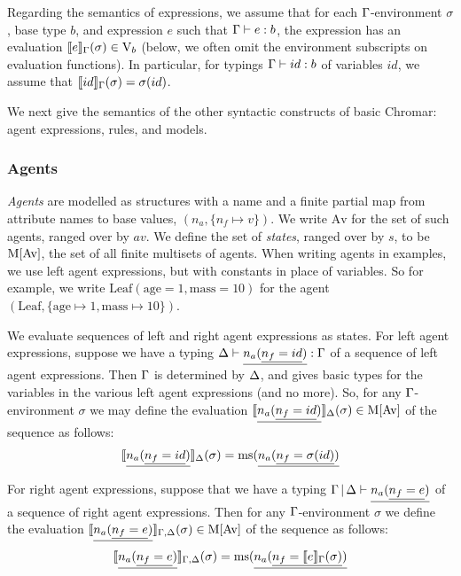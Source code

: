 Regarding the semantics of expressions, we assume that for each $\Gamma$-environment
$\sigma$, base type $b$, and expression $e$ such that $\Gamma\vdash e:b$, the expression has an
evaluation $\llbracket e \rrbracket_{\Gamma}(\sigma) \in \mathrm{V}_b$ (below, we often omit the environment
subscripts on evaluation functions). In particular, for typings $\Gamma\vdash id:b$ of
variables $id$, we assume that $\llbracket id \rrbracket_{\Gamma}(\sigma) = \sigma(id)$.

We next give the semantics of the other syntactic constructs of basic Chromar:
agent expressions, rules, and models.

\subsubsection*{Agents}
\textit{Agents} are modelled as structures with a name and a finite partial map
from attribute names to base values, $ (n_a, \{ n_f \mapsto v \})$. We write
$\mathrm{Av}$ for the set of such agents, ranged over by $av$. We define the set
of \emph{states}, ranged over by $s$, to be $\mathrm{M}[\mathrm{Av}]$, the set of all
finite multisets of agents.
%
When writing agents in examples, we use left agent expressions, but with
constants in place of variables. %
So for example, we write $ \mathrm{Leaf}(\mathrm{age}=1, \mathrm{mass}=10)$ for
the agent $(\mathrm{Leaf},\{\mathrm{age} \mapsto 1, \mathrm{mass} \mapsto 10\}) $.

We evaluate sequences of left and right agent expressions as states.  For left
agent expressions, %
suppose we have a typing $\Delta \vdash \underline{n_a(\underline{n_f=id})} : \Gamma$ of a sequence of left
agent expressions. Then $\Gamma$ is determined by $\Delta$, and gives basic types for
the variables in the various left agent expressions (and no more). So, for any
$\Gamma$-environment $\sigma$ we may define the evaluation
$\llbracket \underline{n_a(\underline{n_f = id})} \rrbracket_{\Delta}(\sigma) \in \mathrm{M}[\mathrm{Av}]$ of the sequence
as follows:
\begin{align*}
\llbracket \underline{n_a(\underline{n_f = id})} \rrbracket_{\Delta}(\sigma) = \mathrm{ms}(\underline{n_a(\underline{n_f =  \sigma(id)})} 
\end{align*}

For right agent expressions, suppose that we have a typing
$\Gamma \,|\, \Delta \vdash \underline{n_a(\underline{n_f = e})}$ of a sequence of right agent expressions. Then
for any $\Gamma$-environment $\sigma$ we define the evaluation
$\llbracket \underline{n_a(\underline{n_f = e})} \rrbracket_{\Gamma,\Delta}(\sigma) \in \mathrm{M}[\mathrm{Av}]$ of the sequence as
follows:
\begin{align*}
\llbracket \underline{n_a(\underline{n_f = e})} \rrbracket_{\Gamma,\Delta}(\sigma) = \mathrm{ms}(\underline{n_a(\underline{n_f = \llbracket e \rrbracket_{\Gamma}(\sigma)})}
\end{align*}

